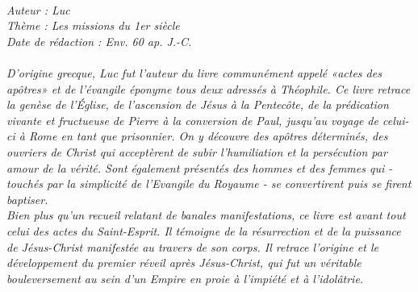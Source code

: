 \BFont
\noindent\hrulefill
{\footnotesize
\textit{
\bigskip
{\centering{}
\\Auteur : Luc
\\Thème : Les missions du 1er siècle
\\Date de rédaction : Env. 60 ap. J.-C.\\}
}
\textit{
\\D’origine grecque, Luc fut l’auteur du livre communément appelé «actes des apôtres» et de l’évangile éponyme tous
deux adressés à Théophile. Ce livre retrace la genèse de l’Église, de l’ascension de Jésus à la Pentecôte, de la prédication vivante et fructueuse de Pierre à la conversion de Paul, jusqu’au voyage de celui-ci à Rome en tant que prisonnier. On y découvre des apôtres déterminés, des ouvriers de Christ qui acceptèrent de subir l’humiliation et la persécution par amour de la vérité. Sont également présentés des hommes et des femmes qui - touchés par la simplicité de l’Evangile du Royaume - se convertirent puis se firent baptiser.
\\Bien plus qu’un recueil relatant de banales manifestations, ce livre est avant tout celui des actes du Saint-Esprit. Il témoigne de la résurrection et de la puissance de Jésus-Christ manifestée au travers de son corps. Il retrace l’origine et le développement du premier réveil après Jésus-Christ,  qui fut un véritable bouleversement au sein d’un Empire en proie à l’impiété et à l’idolâtrie.\bigskip
}
}
\par\nobreak\noindent\hrulefill

